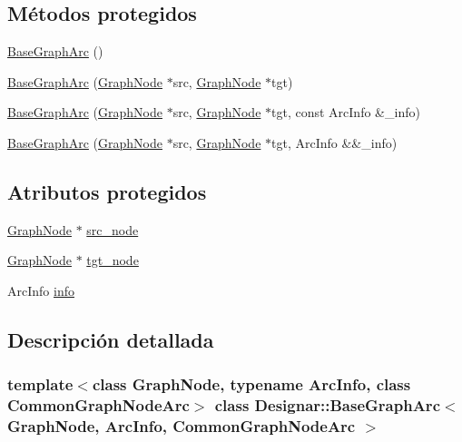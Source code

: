 \subsection*{Métodos protegidos}
\begin{DoxyCompactItemize}
\item 
\hyperlink{class_designar_1_1_base_graph_arc_ab68bc29411653f2d8b12d3ccc5efc1e7}{Base\+Graph\+Arc} ()
\item 
\hyperlink{class_designar_1_1_base_graph_arc_a1a789ba5e3fdb980a066bb56aa258681}{Base\+Graph\+Arc} (\hyperlink{class_designar_1_1_graph_node}{Graph\+Node} $\ast$src, \hyperlink{class_designar_1_1_graph_node}{Graph\+Node} $\ast$tgt)
\item 
\hyperlink{class_designar_1_1_base_graph_arc_a013c1af0c1aadf28260b33585308f7ac}{Base\+Graph\+Arc} (\hyperlink{class_designar_1_1_graph_node}{Graph\+Node} $\ast$src, \hyperlink{class_designar_1_1_graph_node}{Graph\+Node} $\ast$tgt, const Arc\+Info \&\+\_\+info)
\item 
\hyperlink{class_designar_1_1_base_graph_arc_a150cb81ef3f2baac1abee99adae6f410}{Base\+Graph\+Arc} (\hyperlink{class_designar_1_1_graph_node}{Graph\+Node} $\ast$src, \hyperlink{class_designar_1_1_graph_node}{Graph\+Node} $\ast$tgt, Arc\+Info \&\&\+\_\+info)
\end{DoxyCompactItemize}
\subsection*{Atributos protegidos}
\begin{DoxyCompactItemize}
\item 
\hyperlink{class_designar_1_1_graph_node}{Graph\+Node} $\ast$ \hyperlink{class_designar_1_1_base_graph_arc_a3d62765087127c26045bfae7a3c5f6f8}{src\+\_\+node}
\item 
\hyperlink{class_designar_1_1_graph_node}{Graph\+Node} $\ast$ \hyperlink{class_designar_1_1_base_graph_arc_af09ee39743d9a2e6f7bad479d925c273}{tgt\+\_\+node}
\item 
Arc\+Info \hyperlink{class_designar_1_1_base_graph_arc_a8aacc596a2fbca49cc927d6eaac595aa}{info}
\end{DoxyCompactItemize}


\subsection{Descripción detallada}
\subsubsection*{template$<$class Graph\+Node, typename Arc\+Info, class Common\+Graph\+Node\+Arc$>$\newline
class Designar\+::\+Base\+Graph\+Arc$<$ Graph\+Node, Arc\+Info, Common\+Graph\+Node\+Arc $>$}



